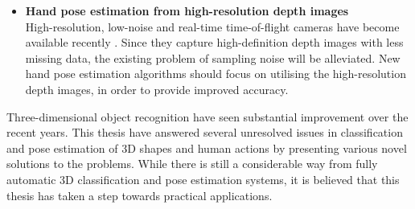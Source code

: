 \begin{itemize}
	\item \textbf{Hand pose estimation from high-resolution depth images}\\
	High-resolution, low-noise and real-time time-of-flight cameras have become available recently \cite{Nair2012}. Since they capture high-definition depth images with less missing data, the existing problem of sampling noise will be alleviated. New hand pose estimation algorithms should focus on utilising the high-resolution depth images, in order to provide improved accuracy.  
\end{itemize}

Three-dimensional object recognition have seen substantial improvement over the recent years.
This thesis have answered several unresolved issues in classification and pose estimation of 3D shapes and human actions by presenting various novel solutions to the problems. While there is still a considerable way from fully automatic 3D classification and pose estimation systems, it is believed that this thesis has taken a step towards practical applications. 
